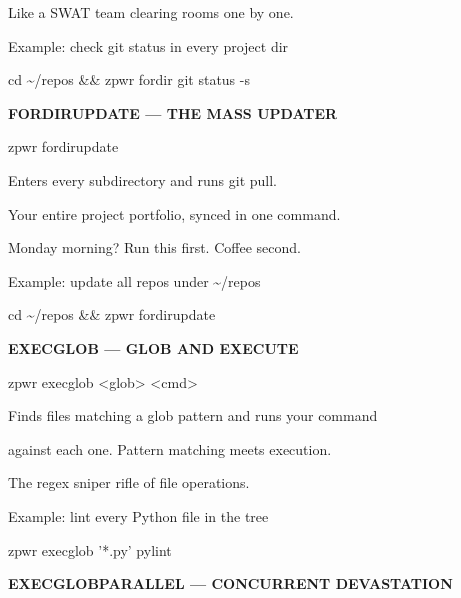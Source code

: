 \documentclass[11pt,a4paper,twoside]{book}
\begin{document}
Like a SWAT team clearing rooms one by one.

Example: check git status in every project dir

\begin{codebox}
cd \textasciitilde{}/repos \&\& zpwr fordir git status -s\\
\end{codebox}


\vspace{12pt}
{\bfseries\color{neonyellow} FORDIRUPDATE — THE MASS UPDATER}\vspace{4pt}

\begin{codebox}
zpwr fordirupdate\\
\end{codebox}

Enters every subdirectory and runs git pull.

Your entire project portfolio, synced in one command.

Monday morning? Run this first. Coffee second.

Example: update all repos under \textasciitilde{}/repos

\begin{codebox}
cd \textasciitilde{}/repos \&\& zpwr fordirupdate\\
\end{codebox}


\vspace{12pt}
{\bfseries\color{neonyellow} EXECGLOB — GLOB AND EXECUTE}\vspace{4pt}

\begin{codebox}
zpwr execglob <glob> <cmd>\\
\end{codebox}

Finds files matching a glob pattern and runs your command

against each one. Pattern matching meets execution.

The regex sniper rifle of file operations.

Example: lint every Python file in the tree

\begin{codebox}
zpwr execglob '*.py' pylint\\
\end{codebox}


\vspace{12pt}
{\bfseries\color{neonyellow} EXECGLOBPARALLEL — CONCURRENT DEVASTATION}\vspace{4pt}
\end{document}
